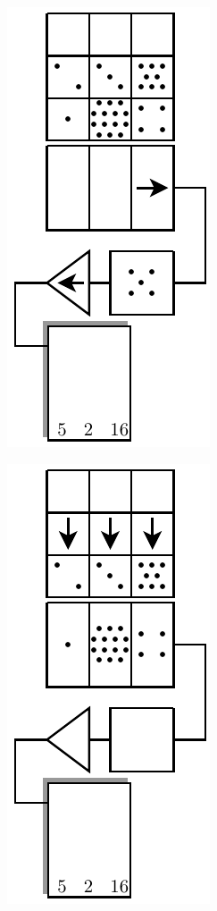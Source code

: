 \begin{figure}[htpb]
\begin{subfigure}[t]{0.25\textwidth}
		\caption{}
		\label{fig:ccd-registry-4}
	\end{subfigure}%
	\begin{subfigure}[t]{0.25\textwidth}
		\centering
		\includegraphics[scale=1.0]{ccd-registry-5.pdf}
		\caption{}
		\label{fig:ccd-registry-5}
	\end{subfigure}%
	\begin{subfigure}[t]{0.25\textwidth}
		\centering
		\includegraphics[scale=1.0]{ccd-registry-6.pdf}

\end{subfigure}
\end{figure}
